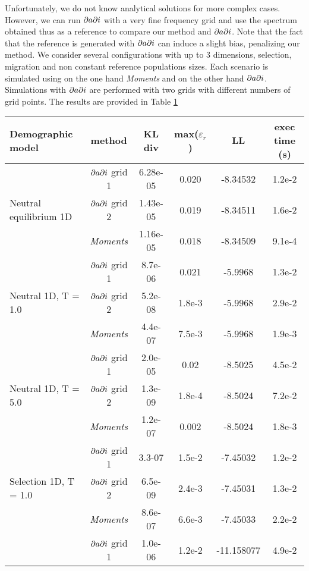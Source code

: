 Unfortunately, we do not know analytical solutions for more complex cases. However, we can run $\partial a \partial i$ with a very fine frequency grid and use the spectrum obtained thus as a reference to compare our method and $\partial a \partial i$. Note that the fact that the reference is generated with $\partial a \partial i$ can induce a slight bias, penalizing our method.
We consider several configurations with up to 3 dimensions, selection, migration and non constant reference populations sizes. Each scenario is simulated using on the one hand \textit{Moments} and on the other hand $\partial a \partial i$. Simulations with $\partial a \partial i$ are performed with two grids with different numbers of grid points. The results are provided in Table \ref{table:vs}
\begin{table}[h!]
\label{table:vs}
\begin{scriptsize}
\begin{tabular}{l|c|*{4}{c}}
Demographic model & method & KL div & max($\varepsilon_r$) & LL & exec time (s)  \\
\hline
 				   & $\partial a \partial i$ grid 1 & 6.28e-05 & 0.020 & -8.34532  & 1.2e-2 \\
Neutral equilibrium 1D & $\partial a \partial i$ grid 2 & 1.43e-05 & 0.019 & -8.34511 & 1.6e-2 \\
 				   & \textit{Moments} & 1.16e-05 & 0.018 & -8.34509 & 9.1e-4 \\
\hline
 				   & $\partial a \partial i$ grid 1 & 8.7e-06 & 0.021 & -5.9968 & 1.3e-2  \\
Neutral 1D, T = 1.0      & $\partial a \partial i$ grid 2 & 5.2e-08 & 1.8e-3 & -5.9968 & 2.9e-2  \\
 				   & \textit{Moments} & 4.4e-07 & 7.5e-3 & -5.9968 & 1.9e-3  \\
\hline
 				   & $\partial a \partial i$ grid 1 & 2.0e-05 & 0.02 & -8.5025 & 4.5e-2  \\
Neutral 1D, T = 5.0      & $\partial a \partial i$ grid 2 & 1.3e-09 & 1.8e-4 & -8.5024 & 7.2e-2  \\
 				   & \textit{Moments} & 1.2e-07 & 0.002 & -8.5024 & 1.8e-3  \\
\hline
 				   & $\partial a \partial i$ grid 1 & 3.3-07 & 1.5e-2 & -7.45032 & 1.2e-2  \\
Selection 1D, T = 1.0   & $\partial a \partial i$ grid 2 & 6.5e-09 & 2.4e-3 & -7.45031 & 1.3e-2  \\
 				   & \textit{Moments} & 8.6e-07 & 6.6e-3 & -7.45033 & 2.2e-2  \\
\hline
 				   & $\partial a \partial i$ grid 1 & 1.0e-06 & 1.2e-2 & -11.158077 & 4.9e-2  \\

\end{tabular}
\end{scriptsize}
\end{table}
